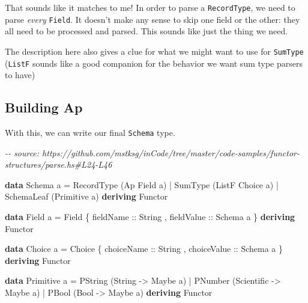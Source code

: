 \documentclass[]{article}
\newenvironment{Shaded}{}{}
\newcommand{\CommentTok}[1]{\textcolor[rgb]{0.38,0.63,0.69}{\textit{#1}}}
\newcommand{\DataTypeTok}[1]{\textcolor[rgb]{0.56,0.13,0.00}{#1}}
\newcommand{\KeywordTok}[1]{\textcolor[rgb]{0.00,0.44,0.13}{\textbf{#1}}}
\newcommand{\NormalTok}[1]{#1}
\newcommand{\OperatorTok}[1]{\textcolor[rgb]{0.40,0.40,0.40}{#1}}
\newcommand{\OtherTok}[1]{\textcolor[rgb]{0.00,0.44,0.13}{#1}}
\begin{document}
That sounds like it matches to me! In order to parse a \texttt{RecordType}, we
need to parse \emph{every} \texttt{Field}. It doesn't make any sense to skip one
field or the other: they all need to be processed and parsed. This sounds like
just the thing we need.

The description here also gives a clue for what we might want to use for
\texttt{SumType} (\texttt{ListF} sounds like a good companion for the behavior
we want sum type parsers to have)

\hypertarget{building-ap}{%
\subsection{Building Ap}\label{building-ap}}

With this, we can write our final \texttt{Schema} type.

\begin{Shaded}
\begin{Highlighting}[]
\CommentTok{{-}{-} source: https://github.com/mstksg/inCode/tree/master/code{-}samples/functor{-}structures/parse.hs\#L24{-}L46}

\KeywordTok{data} \DataTypeTok{Schema}\NormalTok{ a }\OtherTok{=}
      \DataTypeTok{RecordType}\NormalTok{  (}\DataTypeTok{Ap}    \DataTypeTok{Field}\NormalTok{  a)}
    \OperatorTok{|} \DataTypeTok{SumType}\NormalTok{     (}\DataTypeTok{ListF} \DataTypeTok{Choice}\NormalTok{ a)}
    \OperatorTok{|} \DataTypeTok{SchemaLeaf}\NormalTok{  (}\DataTypeTok{Primitive}\NormalTok{ a)}
  \KeywordTok{deriving} \DataTypeTok{Functor}

\KeywordTok{data} \DataTypeTok{Field}\NormalTok{ a }\OtherTok{=} \DataTypeTok{Field}
\NormalTok{    \{}\OtherTok{ fieldName  ::} \DataTypeTok{String}
\NormalTok{    ,}\OtherTok{ fieldValue ::} \DataTypeTok{Schema}\NormalTok{ a}
\NormalTok{    \}}
  \KeywordTok{deriving} \DataTypeTok{Functor}

\KeywordTok{data} \DataTypeTok{Choice}\NormalTok{ a }\OtherTok{=} \DataTypeTok{Choice}
\NormalTok{    \{}\OtherTok{ choiceName  ::} \DataTypeTok{String}
\NormalTok{    ,}\OtherTok{ choiceValue ::} \DataTypeTok{Schema}\NormalTok{ a}
\NormalTok{    \}}
  \KeywordTok{deriving} \DataTypeTok{Functor}

\KeywordTok{data} \DataTypeTok{Primitive}\NormalTok{ a }\OtherTok{=}
      \DataTypeTok{PString}\NormalTok{ (}\DataTypeTok{String}     \OtherTok{{-}>} \DataTypeTok{Maybe}\NormalTok{ a)}
    \OperatorTok{|} \DataTypeTok{PNumber}\NormalTok{ (}\DataTypeTok{Scientific} \OtherTok{{-}>} \DataTypeTok{Maybe}\NormalTok{ a)}
    \OperatorTok{|} \DataTypeTok{PBool}\NormalTok{   (}\DataTypeTok{Bool}       \OtherTok{{-}>} \DataTypeTok{Maybe}\NormalTok{ a)}
  \KeywordTok{deriving} \DataTypeTok{Functor}
\end{Highlighting}
\end{Shaded}
\end{document}
